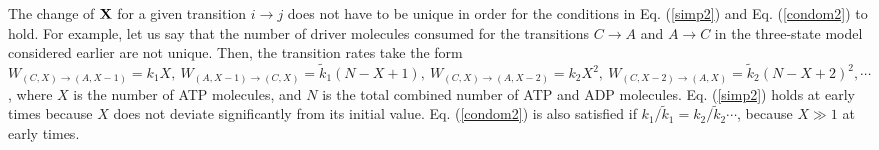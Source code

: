 \documentclass[aps,pre,amsmath,amssymb,floatfix,preprint,nofootinbib]{revtex4}
\begin{document}
The change of ${\bf X}$ for a given transition $i \to j$ does not have to be unique in order for the conditions in Eq. (\ref{simp2}) and Eq. (\ref{condom2}) to hold. For example, let us say that the number of driver molecules consumed for the transitions $C \to A$ and $A \to C$ in the three-state model considered earlier are not unique. Then, the transition rates take the form $W_{(C,X) \to (A,X-1)} = k_1 X,\  W_{(A,X-1) \to (C,X)} = \tilde k_1 (N-X+1),\ W_{(C,X) \to (A,X-2)} = k_2 X^2,\ W_{(C,X-2) \to (A,X)} = \tilde k_2 (N-X+2)^2, \cdots$, where $X$ is the number of ATP molecules,  and $N$ is the total combined number of ATP and ADP molecules. Eq. (\ref{simp2}) holds at early times because $X$ does not deviate significantly from its initial value. Eq. (\ref{condom2}) is also satisfied if $k_1/\tilde k_1 = k_2/\tilde k_2 \cdots$, because $X \gg 1$ at early times.
\end{document}
